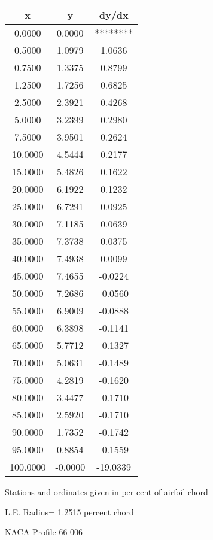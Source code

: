 \documentclass[11pt]{book}
\begin{document}
 \vspace{8mm}
 \begin{tabular}{|c|c|c|} \hline 
  x  &  y  &  dy/dx \\
 \hline
0.0000 & 0.0000 & ******** \\
0.5000 & 1.0979 & 1.0636 \\
0.7500 & 1.3375 & 0.8799 \\
1.2500 & 1.7256 & 0.6825 \\
2.5000 & 2.3921 & 0.4268 \\
5.0000 & 3.2399 & 0.2980 \\
7.5000 & 3.9501 & 0.2624 \\
10.0000 & 4.5444 & 0.2177 \\
15.0000 & 5.4826 & 0.1622 \\
20.0000 & 6.1922 & 0.1232 \\
25.0000 & 6.7291 & 0.0925 \\
30.0000 & 7.1185 & 0.0639 \\
35.0000 & 7.3738 & 0.0375 \\
40.0000 & 7.4938 & 0.0099 \\
45.0000 & 7.4655 & -0.0224 \\
50.0000 & 7.2686 & -0.0560 \\
55.0000 & 6.9009 & -0.0888 \\
60.0000 & 6.3898 & -0.1141 \\
65.0000 & 5.7712 & -0.1327 \\
70.0000 & 5.0631 & -0.1489 \\
75.0000 & 4.2819 & -0.1620 \\
80.0000 & 3.4477 & -0.1710 \\
85.0000 & 2.5920 & -0.1710 \\
90.0000 & 1.7352 & -0.1742 \\
95.0000 & 0.8854 & -0.1559 \\
100.0000 & -0.0000 & -19.0339 \\
 \hline
 \end{tabular}
 \vspace{8mm}


Stations and ordinates given in per cent of airfoil chord 


L.E. Radius=  1.2515 percent chord
 \newpage
  \label{p66-006}
 \begin{Large}
 NACA Profile 66-006
 \end{Large}
  
\end{document}
